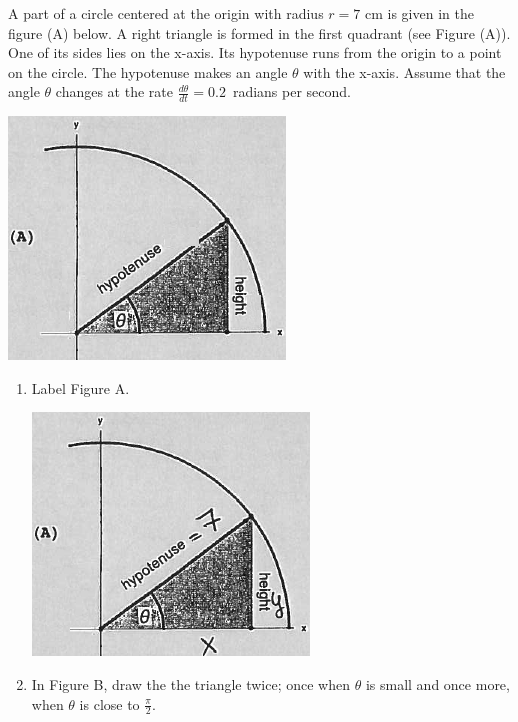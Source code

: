 \documentclass[nooutcomes,handout]{ximera}
\begin{document}
\begin{problem}
A part of a circle centered at the origin with radius $r=7$ cm is given in the figure (A) below.  A right triangle is formed in the first quadrant (see Figure (A)).  One of its sides lies on the x-axis.  Its hypotenuse runs from the origin to a point on the circle.  The hypotenuse makes an angle $\theta$ with the x-axis.  Assume that the angle $\theta$ changes at the rate $\frac{d\theta}{dt}=0.2$\ radians per second.
	\begin{image}
	\includegraphics[scale=.5]{Figure10.png}
	\end{image}
	
\begin{enumerate}
	\item Label Figure A.
		\begin{freeResponse} \hfil
		\begin{image}
	\includegraphics[scale=.5]{Figure11.png}
	\end{image}
		\end{freeResponse}
	\item In Figure B, draw the the triangle twice; once when $\theta$ is small and once more, when $\theta$ is close to $\frac{\pi}{2}$.


\end{enumerate}
\end{problem}
\end{document}
